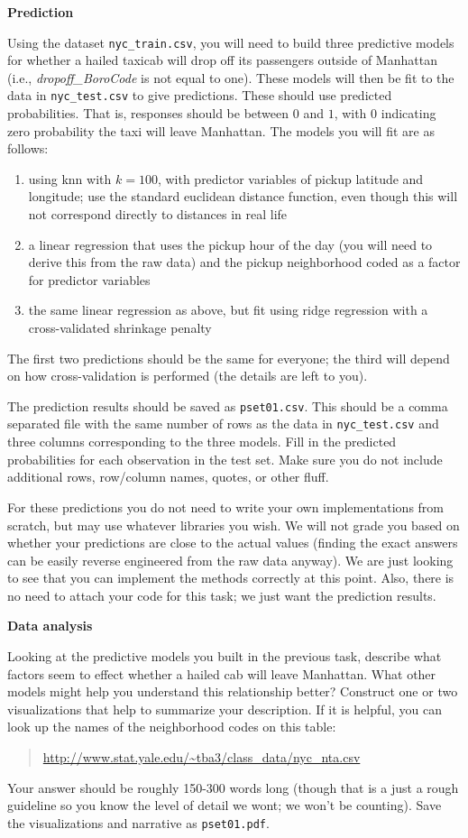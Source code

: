 \documentclass[12pt]{article}
\begin{document}
\newpage

\textbf{Prediction}

Using the dataset \texttt{nyc\_train.csv}, you will need to build three
predictive models for whether a hailed taxicab will drop off its
passengers outside of Manhattan (i.e., \textit{dropoff\_BoroCode} is
not equal to one). These models will then be fit to the data
in \texttt{nyc\_test.csv} to give predictions. These should use
predicted probabilities. That is, responses should be between
$0$ and $1$, with $0$ indicating zero probability the taxi will
leave Manhattan. The models you will fit are as follows:
\begin{enumerate}
\item using knn with $k=100$, with predictor variables of pickup latitude
      and longitude; use the standard euclidean distance function, even
      though this will not correspond directly to distances in real life
\item a linear regression that uses the pickup hour of the day (you will need to
      derive this from the raw data) and the pickup neighborhood coded as
      a factor for predictor variables
\item the same linear regression as above, but fit using ridge regression
      with a cross-validated shrinkage penalty
\end{enumerate}
The first two predictions should be the same for everyone; the third will
depend on how cross-validation is performed (the details are left to you).

The prediction results should be saved as \texttt{pset01.csv}. This should
be a comma separated file with the same number of rows as the data in
\texttt{nyc\_test.csv} and three columns corresponding to the three models.
Fill in the predicted probabilities for each observation in the test set.
Make sure you do not include additional rows, row/column names, quotes, or
other fluff.

For these predictions you do not need to write your own implementations
from scratch, but may use whatever libraries you wish. We will not grade
you based on whether your
predictions are close to the actual values (finding the exact answers can be
easily reverse engineered from the raw data anyway). We are just looking to
see that you can implement the methods correctly at this point. Also, there
is no need to attach your code for this task; we just want the prediction
results.

\textbf{Data analysis}

Looking at the predictive models you built in the previous task, describe
what factors seem to effect whether a hailed cab will leave Manhattan.
What other models might help you understand this relationship better?
Construct one or two visualizations that help to summarize your description.
If it is helpful, you can look up the names of the neighborhood codes
on this table:
\begin{quote}
\url{http://www.stat.yale.edu/~tba3/class_data/nyc_nta.csv}
\end{quote}
Your answer should be roughly 150-300 words long (though that is a just
a rough guideline so you know the level of detail we wont; we won't be
counting). Save the visualizations and narrative as \texttt{pset01.pdf}.
\end{document}
